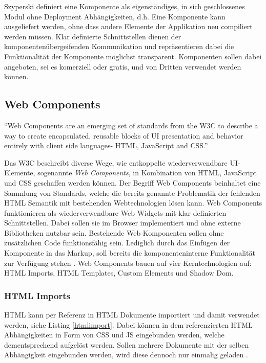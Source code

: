 Szyperski definiert eine Komponente als eigenständiges, in sich geschlossenes Modul ohne Deployment
Abhängigkeiten, d.h. Eine Komponente kann ausgeliefert werden, ohne dass andere Elemente der Applikation neu compiliert werden müssen.
Klar definierte Schnittstellen dienen der komponentenübergeifenden Kommunikation und repräsentieren
dabei die Funktionalität der Komponente möglichst transparent.
Komponenten sollen dabei angeboten, sei es komerziell oder gratis,
und von Dritten verwendet werden können.


\subsection{Web Components}

``Web Components are an emerging set of standards from the W3C to describe a way to create encapsulated,
reusable blocks of UI presentation and behavior entirely with client side languages- HTML, JavaScript and CSS.''
\cite[42]{Web-Component-Architecture}
\vspace{0.3cm}

Das \ac{W3C} beschreibt diverse Wege, wie entkoppelte wiederverwendbare UI-Elemente, sogenannte \emph{Web Components},
in Kombination von \ac{HTML}, JavaScript und \ac{CSS} geschaffen werden können.
Der Begriff Web Components beinhaltet eine Sammlung von Standards,
welche die bereits genannte Problematik der fehlenden HTML Semantik mit bestehenden Webtechnologien lösen kann.
Web Components funktionieren als wiederverwendbare Web Widgets mit klar definierten Schnittstellen.
Dabei sollen sie im Browser implementiert und ohne externe Bibliotheken nutzbar sein.
Bestehende Web Komponenten sollen ohne zusätzlichen Code funktionsfähig sein. Lediglich durch das Einfügen der Komponente
in das Markup, soll bereits die komponenteninterne Funktionalität zur Verfügung stehen
\cite[42]{Web-Component-Architecture}.
Web Components bauen auf vier Kerntechnologien auf: HTML Imports, HTML Templates, Custom Elements und Shadow Dom.

\subsubsection{HTML Imports}
HTML kann per Referenz in HTML Dokumente importiert und damit verwendet werden, siehe Listing \ref{htmlimport}.
Dabei können in dem referenzierten HTML Abhängigkeiten in Form von CSS und JS eingebunden werden,
welche dementsprechend aufgelöst werden.
Sollen mehrere Dokumente mit der selben Abhängigkeit eingebunden werden, wird diese dennoch nur einmalig geladen
\cite{HTMLI44:online}.

